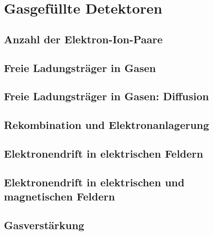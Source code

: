 \documentclass{article}
\begin{document}
% 		
% 				


\section{Gasgefüllte Detektoren}
\graphicspath{{bilder/3-1/}}

	\subsection{Anzahl der Elektron-Ion-Paare}
		
	\subsection{Freie Ladungsträger in Gasen}
		
	\subsection{Freie Ladungsträger in Gasen: Diffusion}
		
	\subsection{Rekombination und Elektronanlagerung}
		
	\subsection{Elektronendrift in elektrischen Feldern}
		
	\subsection{Elektronendrift in elektrischen und magnetischen Feldern}
		
	\subsection{Gasverstärkung}
		
				
				
\end{document}
